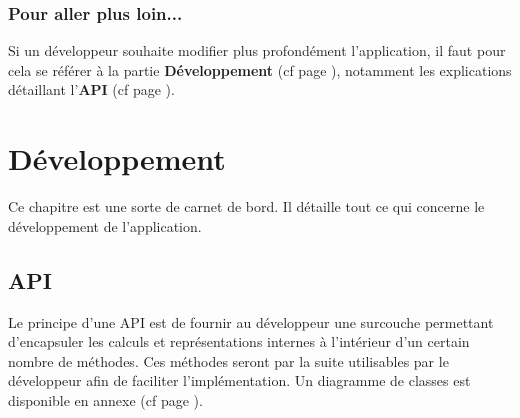 \documentclass[a4paper]{memoir}
\begin{document}
			\subsection{Pour aller plus loin...}
				Si un développeur souhaite modifier plus profondément l'application, il faut pour cela se référer à la partie \textbf{Développement} (cf 
				page \pageref{dev}), notamment les explications détaillant l'\textbf{API} (cf page \pageref{api-dev}).

	\chapter{Développement}
		\label{dev}
		Ce chapitre est une sorte de carnet de bord. Il détaille tout ce qui concerne le développement de l'application.
		
		\section{API}
			\label{api-dev}
			Le principe d'une API est de fournir au développeur une surcouche permettant d'encapsuler les calculs et représentations internes à l'intérieur 
			d'un certain nombre de méthodes. Ces méthodes seront par la suite utilisables par le développeur afin de faciliter l'implémentation. Un 
			diagramme de classes est disponible en annexe (cf page \pageref{fig:diagClass}).
			
\end{document}
